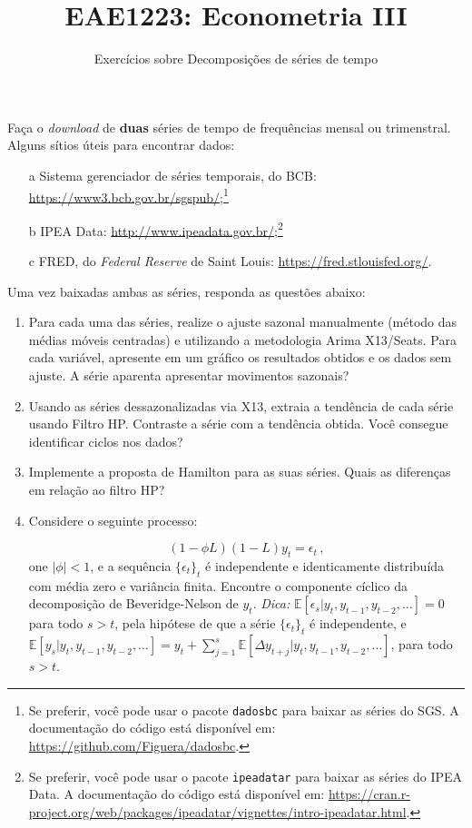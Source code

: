 \documentclass[10pt,a4paper]{article}
\title{\large EAE1223: Econometria III}
\author{\normalsize Exercícios sobre Decomposições de séries de tempo}
\date{}
\begin{document}
	\maketitle
	Faça o \textit{download} de \textbf{duas} séries de tempo de frequências mensal ou trimenstral. Alguns sítios úteis para encontrar dados: 
	\begin{enumerate}
		\item[a]  Sistema gerenciador de séries temporais, do BCB: \url{https://www3.bcb.gov.br/sgspub/};\footnote{Se preferir, você pode usar o pacote \texttt{dadosbc} para baixar as séries do SGS. A documentação do código está disponível em: \url{https://github.com/Figuera/dadosbc}. }
		\item[b] IPEA Data: \url{http://www.ipeadata.gov.br/};\footnote{Se preferir, você pode usar o pacote \texttt{ipeadatar} para baixar as séries do IPEA Data. A documentação do código está disponível em: \url{https://cran.r-project.org/web/packages/ipeadatar/vignettes/intro-ipeadatar.html}. }
		\item[c] FRED, do \textit{Federal Reserve} de Saint Louis: \url{https://fred.stlouisfed.org/}.
	\end{enumerate}
	Uma vez baixadas ambas as séries, responda as questões abaixo:
	\begin{enumerate}
		\item Para cada uma das séries, realize o ajuste sazonal manualmente (método das médias móveis centradas) e utilizando a metodologia Arima X13/Seats. Para cada variável, apresente em um gráfico os resultados obtidos e os dados sem ajuste. A série aparenta apresentar movimentos sazonais?
		\item Usando as séries dessazonalizadas via X13, extraia a tendência de cada série usando Filtro HP. Contraste a série com a tendência obtida. Você consegue identificar ciclos nos dados?
		\item Implemente a proposta de Hamilton para as suas séries. Quais as diferenças em relação ao filtro HP?
		
		\item Considere o seguinte processo:
		
		$$(1-\phi L) (1-L)y_t = \epsilon_t \, ,$$
		one $|\phi|<1$, e a sequência $\{\epsilon_t\}_t$ é independente e identicamente distribuída com média zero e variância finita. Encontre o componente cíclico da decomposição de Beveridge-Nelson de $y_t$. \textit{Dica:} $\mathbb{E}[\epsilon_s| y_{t}, y_{t-1}, y_{t-2}, \ldots ] = 0$ para todo $s > t$, pela hipótese de que a série $\{\epsilon_t\}_t$ é independente, e $\mathbb{E}[y_{s}| y_{t}, y_{t-1}, y_{t-2}, \ldots ] = y_t + \sum_{j=1}^s \mathbb{E}[\Delta y_{t+j}| y_{t}, y_{t-1}, y_{t-2}, \ldots ]$, para todo $s > t$.
	\end{enumerate}
			
\end{document}
